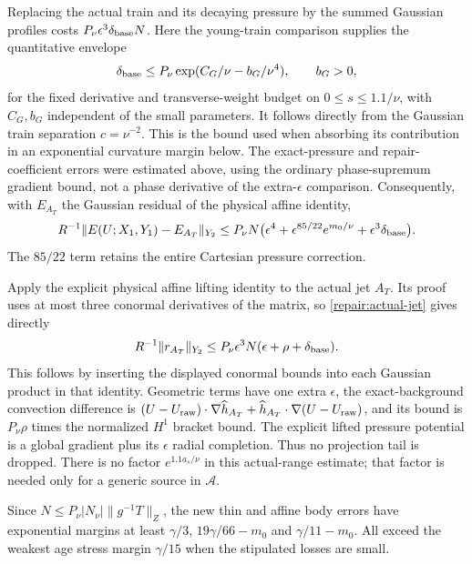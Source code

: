 Replacing the actual train and its decaying pressure by the summed
Gaussian profiles costs $P_\nu\epsilon^3\delta_{\rm base}N$.
Here the young-train comparison supplies the quantitative envelope
\[
 \delta_{\rm base}\le
       P_\nu\exp(C_G/\nu-b_G/\nu^4),\qquad b_G>0,
\]
for the fixed derivative and transverse-weight budget on
$0\le s\le1.1/\nu$, with $C_G,b_G$ independent of the small
parameters. It follows directly from the Gaussian train separation
$c=\nu^{-2}$. This is the bound used when absorbing its contribution
in an exponential curvature margin below.
The exact-pressure and repair-coefficient errors were estimated
above, using the ordinary phase-supremum gradient bound, not a
phase derivative of the extra-$\epsilon$ comparison. Consequently,
with $E_{A_T}$ the Gaussian residual of the physical affine identity,
\begin{equation}\label{repair:thin-complete}
 R^{-1}\|E(U;X_1,Y_1)-E_{A_T}\|_{Y_2}
 \le P_\nu N\bigl(\epsilon^4+
       \epsilon^{85/22}e^{m_0/\nu}
                         +\epsilon^3\delta_{\rm base}\bigr).
\end{equation}
The $85/22$ term retains the entire Cartesian pressure correction.

Apply the explicit physical affine lifting identity to the actual
jet $A_T$. Its proof uses at most three conormal derivatives of the
matrix, so \eqref{repair:actual-jet} gives directly
\begin{equation}\label{repair:actual-affine-remainder}
 R^{-1}\|r_{A_T}\|_{Y_2}
 \le P_\nu\epsilon^3N
       (\epsilon+\rho+\delta_{\rm base}).
\end{equation}
This follows by inserting the displayed conormal bounds into each
Gaussian product in that identity. Geometric terms have one extra
$\epsilon$, the exact-background convection difference is
$(U-U_{\rm raw})\cdot\nabla\widehat h_{A_T}
+\widehat h_{A_T}\cdot\nabla(U-U_{\rm raw})$, and its bound is
$P_\nu\rho$ times the normalized $H^1$ bracket bound. The explicit
lifted pressure potential is a global gradient plus its
$\epsilon$ radial completion. Thus no projection tail is dropped.
There is no factor $e^{1.1a_s/\nu}$ in this actual-range estimate;
that factor is needed only for a generic source in $\mathscr A$.

Since $N\le P_\nu|N_\nu|\|g^{-1}T\|_Z$, the new thin and
affine body errors have exponential margins at least
$\gamma/3$, $19\gamma/66-m_0$ and $\gamma/11-m_0$.
All exceed the weakest age stress margin $\gamma/15$ when the
stipulated losses are small.

